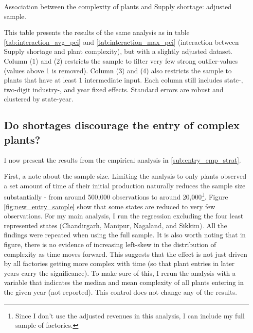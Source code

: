\documentclass[11pt]{article}
\begin{document}
\begin{table}[H] 
	\begin{center}
		\begin{threeparttable}
			\caption{Association between the complexity of plants and Supply shortage: adjusted sample.}
			\label{tab:filtered_input}
			
			\begin{tablenotes} \footnotesize 
			\item[1] This table presents the results of the same analysis as in table \ref{tab:interaction_avg_pci} and \ref{tab:interaction_max_pci} (interaction between Supply shortage and plant complexity), but with a slightly adjusted dataset. Column (1) and (2) restricts the sample to filter very few strong outlier-values (values above 1 is removed). Column (3) and (4) also restricts the sample to plants that have at least 1 intermediate input. Each column still includes state-, two-digit industry-, and year fixed effects. Standard errors are robust and clustered by state-year.
			\end{tablenotes}
		\end{threeparttable}
	\end{center}
\end{table}   

\newpage
\subsection{Do shortages discourage the entry of complex plants?}
\label{sub:longterm}
I now present the results from the empirical analysis in \ref{sub:entry_emp_strat}.

First, a note about the sample size. Limiting the analysis to only plants observed a set amount of time af their initial production naturally reduces the sample size substantially - from around 500,000 observations to around 20,000\footnote{Since I don't use the adjusted revenues in this analysis, I can include my full sample of factories.}. Figure \ref{fig:new_entry_sample} show that some states are reduced to very few observations. For my main analysis, I run the regression excluding the four least represented states (Chandirgarh, Manipur, Nagaland, and Sikkim). All the  findings were repeated when using the full sample. It is also worth noting that in figure, there is no evidence of increasing left-skew in the distribution of complexity as time moves forward. This suggests that the effect is not just driven by all factories getting more complex with time (so that plant entries in later years carry the significance). To make sure of this, I rerun the analysis with a variable that indicates the median and mean complexity of all plants entering in the given year (not reported). This control does not change any of the results.
\end{document}
